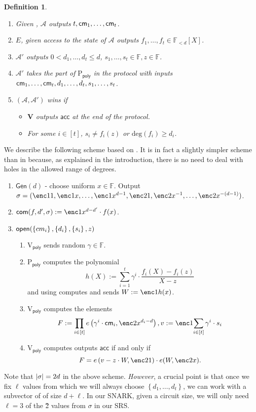 \documentclass[11pt]{article}
\numberwithin{figure}{section} %
\newtheorem{dfn}[thm]{Definition}
\newcommand{\set}[1]{\ensuremath{\left\{#1\right\}}\xspace}
\newcommand{\F}{\ensuremath{\mathbb F}\xspace}
\newcommand{\adv}{\ensuremath{\mathcal A}\xspace}
\newcommand{\advprime}{\ensuremath{{\mathcal A}'}\xspace}
\renewcommand{\deg}{\ensuremath{\mathrm{deg}}\xspace}
\newcommand{\acc}{\ensuremath{\mathsf{acc}}\xspace}
\newcommand{\defeq}{:=}
\newcommand{\gen}{\ensuremath{\mathsf{Gen}}\xspace}
\newcommand{\prvpoly}{\ensuremath{\mathrm{P_{\mathsf{poly}}}}\xspace}
\newcommand{\verpoly}{\ensuremath{\mathrm{V_{\mathsf{poly}}}}\xspace}
\newcommand{\ver}{\ensuremath{\mathsf{\mathbf{V}}}\xspace}
\newcommand{\ext}{\ensuremath{E}\xspace}
\newcommand{\polysofdeg}[1]{\ensuremath{\F_{< #1}[X]}\xspace}
\begin{document}
\begin{dfn}
\begin{itemize}
 \begin{enumerate}
  \item Given \srs, \adv outputs $t,\mathsf{cm}_1,\ldots,\mathsf{cm}_t$.
  \item \ext, given access to the state of \adv outputs $f_1,\ldots,f_t \in \polysofdeg{d}$.
  \item \advprime outputs $0< d_1,\ldots,d_t \leq d$, $s_1,\ldots,s_t \in \F,z \in \F$.
  \item \advprime takes the part of \prvpoly in the protocol \open with inputs
  $\mathsf{cm}_1,\ldots,\mathsf{cm}_t,d_1,\ldots,d_t,s_1,\ldots,s_t$.
  \item $(\adv,\advprime)$ wins if 
  \begin{itemize} 
   \item \ver outputs \acc at the end of the protocol.
   \item For some $i\in [t]$, $s_i\neq f_i(z)$ or $\deg(f_i)\geq d_i$.
  \end{itemize}

 \end{enumerate}

\end{itemize}
\end{dfn}
We describe the following scheme based on \cite{kate,sonic}.
It is in fact a slightly simpler scheme than in \cite{sonic} because, as explained in the introduction, there is no need to deal with holes in the allowed range of degrees.
\begin{enumerate}
 \item $\gen(d)$ - choose uniform $x\in \F$. Output $\srs =(\enc1{1},\enc1{x},\ldots,\enc1{x^{d-1}},\enc2{1},\enc2{x^{-1}},\ldots,\enc2{x^{-(d-1)}})$.
 \item $\com(f,d',\srs) \defeq \enc1{x^{d-d'}\cdot f(x)}$.
 \item $\open(\set{cm_i},\set{d_i},\set{s_i},z)$
 \begin{enumerate}
  \item \verpoly sends random $\gamma\in \F$.
 \item \prvpoly computes the polynomial
 \[h(X)\defeq \sum_{i=1}^t \gamma^{i}\cdot \frac{f_i(X)-f_i(z)}{X-z}  \]
 and using \srs computes and sends $W\defeq \enc1{h(x)}$.
 \item\label{step:computeW} \verpoly computes the elements 
 \[F\defeq \prod_{i\in [t]}e\left(\gamma^{i} \cdot \cm_i, \enc2{x^{d_i-d}} \right), v\defeq \enc1{\sum_{i\in [t]} \gamma^{i}\cdot s_i}\]
 \item \verpoly computes outputs \acc if and only if
 \[ F= e\left(v- z\cdot W,\enc2{1}\right )\cdot e(W,\enc2{x} ). \]
 \end{enumerate}

\end{enumerate}
Note that $|\sigma| = 2d$ in the above scheme.
\emph{However}, a crucial point is that once we fix $\ell$ values from which we will always choose \set{d_1,\ldots,d_t},
we can work with a subvector of \srs of size $d+\ell$. In our SNARK, given a circuit size, we will only need $\ell=3$ of the \G2 values from $\sigma$ in our SRS.
\end{document}
